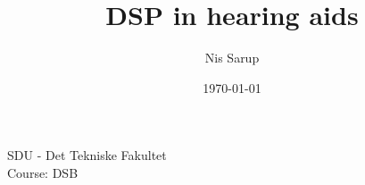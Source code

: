 \documentclass[a4wide,10pt]{article}
\begin{document}
\title{DSP in hearing aids}
\author{Nis Sarup}
\date{\today}
\maketitle
\begin{center}
	SDU - Det Tekniske Fakultet\\
	Course: DSB\\
\end{center}
\newpage
\end{document}
